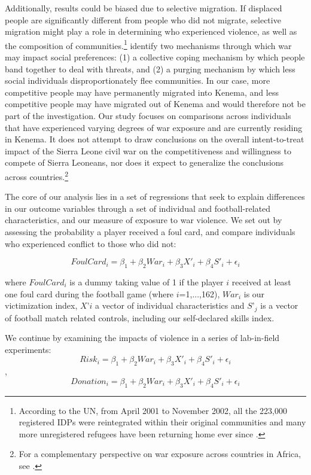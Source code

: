 Additionally, results could be biased due to selective migration. If displaced people are significantly different from people who did not migrate, selective migration might play a role in determining who experienced violence, as well as the composition of communities.\footnote{According to the UN, from April 2001 to November 2002, all the 223,000 registered IDPs were reintegrated within their original communities and many more unregistered refugees have been returning home ever since \citep{NorwegianRefugeeCouncil2003}.} \citet{Gilligan2014} identify two mechanisms through which war may impact social preferences: (1) a collective coping mechanism by which people band together to deal with threats, and (2) a purging mechanism by which less social individuals disproportionately flee communities. In our case, more competitive people may have permanently migrated into Kenema, and less competitive people may have migrated out of Kenema and would therefore not be part of the investigation. Our study focuses on comparisons across individuals that have experienced varying degrees of war exposure and are currently residing in Kenema. It does not attempt to draw conclusions on the overall intent-to-treat impact of the Sierra Leone civil war on the competitiveness and willingness to compete of Sierra Leoneans, nor does it expect to generalize the conclusions across countries.\footnote{For a complementary perspective on war exposure across countries in Africa, see \citet{Adhvaryu2013}.} 

The core of our analysis lies in a set of regressions that seek to explain differences in our outcome variables through a set of individual and football-related characteristics, and our measure of exposure to war violence. We set out by assessing the probability a player received a foul card, and compare individuals who experienced conflict to those who did not: 

\begin{equation}
\label{eq:slf:foul}
FoulCard_i = \beta_1 + \beta_2 War_i + \beta_3 X'_i + \beta_4 S'_i + \epsilon_i
\end{equation}

where $FoulCard_i$ is a dummy taking value of 1 if the player $i$ received at least one foul card during the football game (where $i$=1,...,162), $War_i$ is our victimization index, $X’i$ a vector of individual characteristics and $S’_j$ is a vector of football match related controls, including our self-declared skills index. 

We continue by examining the impacts of violence in a series of lab-in-field experiments:
\begin{equation}
\label{eq:slf:risk}
Risk_i = \beta_1 + \beta_2 War_i + \beta_3 X'_i + \beta_4 S'_i + \epsilon_i
\end{equation}
,
\begin{equation}
\label{eq:slf:donation}
Donation_i = \beta_1 + \beta_2 War_i + \beta_3 X'_i + \beta_4 S'_i + \epsilon_i
\end{equation}

